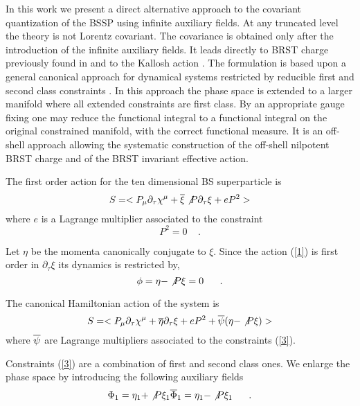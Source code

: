 \documentclass[a4paper,10pt]{article}
\begin{document}
In this work we present a direct alternative approach to  the
covariant quantization of the BSSP using infinite  auxiliary
fields. At any truncated level the theory is not Lorentz
covariant.  The covariance is obtained only after the introduction
of the infinite  auxiliary fields. It leads directly to BRST
charge previously found in \cite{[9]} and  to the Kallosh action \cite{[10]}.
The formulation is based upon a general canonical  approach for
dynamical systems restricted by reducible first and second  class
constraints \cite{[11],[12]}. In this approach the phase space is
extended to a larger manifold where all extended constraints are
first class. By an appropriate gauge fixing one may reduce the
functional integral to a functional integral on the original
constrained manifold, with the correct functional measure. It is
an off-shell approach allowing the systematic construction of the
off-shell nilpotent BRST charge and of the BRST invariant
effective action.

The first order action for the ten dimensional BS superparticle is
\begin{equation}
\label{1}
S=<P_\mu \partial_\tau \chi^\mu +\overline{\xi} \not{P}
\partial_\tau \xi+eP^2>
\end{equation}
where $e$ is a Lagrange multiplier associated to the constraint
\begin{equation}
\label{2}
P^2=0\ \ \ \ \ .
\end{equation}

Let $\eta$ be the momenta canonically conjugate to $\xi$. Since the action
(\ref{1}) is first order in $\partial_\tau\xi$ its dynamics is restricted by,
\begin{equation}
\label{3}
\phi =\eta -\not{P} \xi =0 \ \ \ \ \ .
\end{equation}

The canonical Hamiltonian action of the system is
\begin{equation}
\label{4}
S=<P_\mu \partial_\tau \chi^\mu +\overline{\eta} \partial_\tau \xi
+eP^2+ \overline{\psi}(\eta -\not{P} \xi )>
\end{equation}
where
$\overline{\psi}$ are Lagrange multipliers associated to the constraints
(\ref{3}).

Constraints (\ref{3}) are a combination of first and second class ones.
We enlarge the phase space by introducing the following auxiliary fields
\begin{displaymath}
\Phi_1 =\eta_1+\not{P} \xi_1\\
\overline{\Phi}_1 =\eta_1-\not{P} \xi_1 \ \ \ \ \ .
\end{displaymath}
\end{document}

